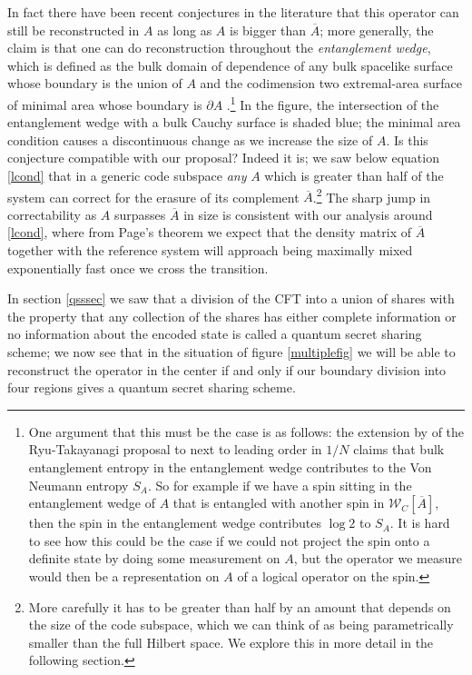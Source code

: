 \documentclass[12pt]{article}
\newcommand{\W}{\mathcal{W}}
\newcommand{\ol}{\overline}
\begin{document}
In fact there have been recent conjectures in the literature that this operator can still be reconstructed in $A$ as long as $A$ is bigger than $\ol{A}$; more generally, the claim is that one can do reconstruction throughout the \textit{entanglement wedge}, which is defined as the bulk domain of dependence of any bulk spacelike surface whose boundary is the union of $A$ and the codimension two extremal-area surface of minimal area whose boundary is $\partial A$ \cite{Czech:2012bh,Wall:2012uf,Headrick:2014cta,Jafferis:2014lza}.\footnote{One argument that this must be the case is as follows: the extension by \cite{Faulkner:2013ana} of the Ryu-Takayanagi proposal \cite{Ryu:2006bv} to next to leading order in $1/N$ claims that bulk entanglement entropy in the entanglement wedge contributes to the Von Neumann entropy $S_A$.  So for example if we have a spin sitting in the entanglement wedge of $A$ that is entangled with another spin in $\W_C[\ol{A}]$, then the spin in the entanglement wedge contributes $\log 2$ to $S_A$.  It is hard to see how this could be the case if we could not project the spin onto a definite state by doing some measurement on $A$, but the operator we measure would then be a representation on $A$ of a logical operator on the spin.}  In the figure, the intersection of the entanglement wedge with a bulk Cauchy surface is shaded blue; the minimal area condition causes a discontinuous change as we increase the size of $A$.  Is this conjecture compatible with our proposal?  Indeed it is; we saw below equation \eqref{lcond} that in a generic code subspace \textit{any} $A$ which is greater than half of the system can correct for the erasure of its complement $\ol{A}$.\footnote{More carefully it has to be greater than half by an amount that depends on the size of the code subspace, which we can think of as being parametrically smaller than the full Hilbert space.  We explore this in more detail in the following section.}  The sharp jump in correctability as $A$ surpasses $\ol{A}$ in size is consistent with our analysis around \eqref{lcond}, where from Page's theorem we expect that the density matrix of $\ol{A}$ together with the reference system will approach being maximally mixed exponentially fast once we cross the transition.


In section \ref{qsssec} we saw that a division of the CFT into a union of shares with the property that any collection of the shares has either complete information or no information about the encoded state is called a quantum secret sharing scheme; we now see that in the situation of figure \ref{multiplefig} we will be able to reconstruct the operator in the center if and only if our boundary division into four regions gives a quantum secret sharing scheme.  
\end{document}
